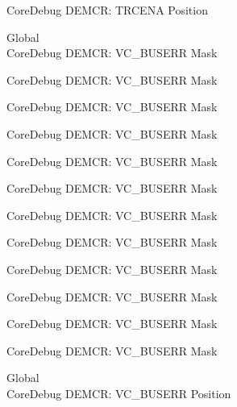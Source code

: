 \begin{DoxyRefList}
\label{deprecated__deprecated001276}%
%
Core\+Debug DEMCR\+: TRCENA Position  
\item[Global \doxylink{group___c_m_s_i_s___core_debug_ga9d29546aefe3ca8662a7fe48dd4a5b2b}{Core\+Debug\+\_\+\+DEMCR\+\_\+\+VC\+\_\+\+BUSERR\+\_\+\+Msk} ]\hfill \\
\label{deprecated__deprecated000060}%
%
Core\+Debug DEMCR\+: VC\+\_\+\+BUSERR Mask 

\label{deprecated__deprecated000204}%
%
Core\+Debug DEMCR\+: VC\+\_\+\+BUSERR Mask 

\label{deprecated__deprecated000346}%
%
Core\+Debug DEMCR\+: VC\+\_\+\+BUSERR Mask 

\label{deprecated__deprecated000422}%
%
Core\+Debug DEMCR\+: VC\+\_\+\+BUSERR Mask 

\label{deprecated__deprecated000511}%
%
Core\+Debug DEMCR\+: VC\+\_\+\+BUSERR Mask 

\label{deprecated__deprecated000613}%
%
Core\+Debug DEMCR\+: VC\+\_\+\+BUSERR Mask 

\label{deprecated__deprecated000738}%
%
Core\+Debug DEMCR\+: VC\+\_\+\+BUSERR Mask 

\label{deprecated__deprecated000882}%
%
Core\+Debug DEMCR\+: VC\+\_\+\+BUSERR Mask 

\label{deprecated__deprecated001024}%
%
Core\+Debug DEMCR\+: VC\+\_\+\+BUSERR Mask 

\label{deprecated__deprecated001100}%
%
Core\+Debug DEMCR\+: VC\+\_\+\+BUSERR Mask 

\label{deprecated__deprecated001189}%
%
Core\+Debug DEMCR\+: VC\+\_\+\+BUSERR Mask 

\label{deprecated__deprecated001291}%
%
Core\+Debug DEMCR\+: VC\+\_\+\+BUSERR Mask  
\item[Global \doxylink{group___c_m_s_i_s___core_debug_gab8e3d8f0f9590a51bbf10f6da3ad6933}{Core\+Debug\+\_\+\+DEMCR\+\_\+\+VC\+\_\+\+BUSERR\+\_\+\+Pos} ]\hfill \\
\label{deprecated__deprecated000059}%
%
Core\+Debug DEMCR\+: VC\+\_\+\+BUSERR Position 


\end{DoxyRefList}
